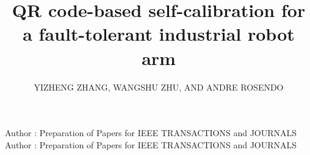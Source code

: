 \documentclass{ieeeaccess}
\begin{document}

\title{QR code-based self-calibration for a fault-tolerant industrial robot arm}
\author{\uppercase{Yizheng Zhang},
\uppercase{Wangshu Zhu, and Andre Rosendo}}
\address[1]{
	Living Machine Lab,
	ShanghaiTech University,
	Shanghai, China
	(e-mail: zhangyzh1@shanghaitech.edu.cn)}
\address[2]{
	Living Machine Lab,
ShanghaiTech University,
Shanghai, China
(e-mail: zhuwsh@shanghaitech.edu.cn)}
\address[3]{
	Living Machine Lab,
ShanghaiTech University,
Shanghai, China
(e-mail: arosendo@shanghaitech.edu.cn)}

\markboth
{Author \headeretal: Preparation of Papers for IEEE TRANSACTIONS and JOURNALS}
{Author \headeretal: Preparation of Papers for IEEE TRANSACTIONS and JOURNALS}

\end{document}
